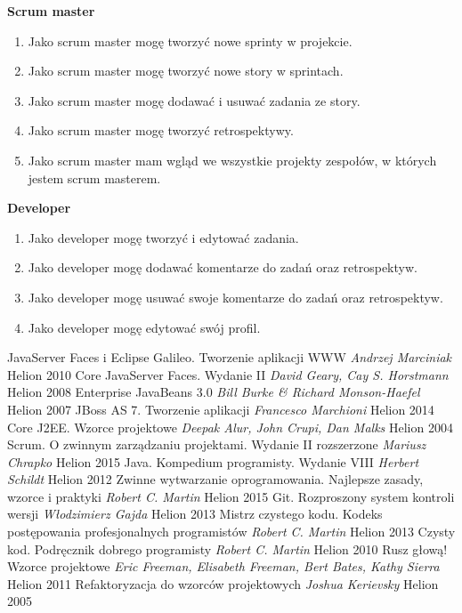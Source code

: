 	\textbf{Scrum master}
	\begin{enumerate}		
		\item Jako scrum master mogę tworzyć nowe sprinty w projekcie.
		\item Jako scrum master mogę tworzyć nowe story w sprintach.
		\item Jako scrum master mogę dodawać i usuwać zadania ze story.
		\item Jako scrum master mogę tworzyć retrospektywy.
		\item Jako scrum master mam wgląd we wszystkie projekty zespołów, w których jestem scrum masterem.
	\end{enumerate}
	\textbf{Developer}
	\begin{enumerate}		
		\item Jako developer mogę tworzyć i edytować zadania.
		\item Jako developer mogę dodawać komentarze do zadań oraz retrospektyw.
		\item Jako developer mogę usuwać swoje komentarze do zadań oraz retrospektyw.
		\item Jako developer mogę edytować swój profil.
	\end{enumerate}
	

\newpage
\begin{thebibliography}{99}
	 JavaServer Faces i Eclipse Galileo. Tworzenie aplikacji WWW \emph{Andrzej Marciniak} Helion 2010
	 Core JavaServer Faces. Wydanie II \emph{David Geary, Cay S. Horstmann} Helion 2008
	 Enterprise JavaBeans 3.0 \emph{Bill Burke \& Richard Monson-Haefel} Helion 2007
	 JBoss AS 7. Tworzenie aplikacji \emph{Francesco Marchioni} Helion 2014
	 Core J2EE. Wzorce projektowe \emph{Deepak Alur, John Crupi, Dan Malks} Helion 2004
	 Scrum. O zwinnym zarządzaniu projektami. Wydanie II rozszerzone \emph{Mariusz Chrapko} Helion 2015
	 Java. Kompedium programisty. Wydanie VIII \emph{Herbert Schildt} Helion 2012
	 Zwinne wytwarzanie oprogramowania. Najlepsze zasady, wzorce i praktyki \emph{Robert C. Martin} Helion 2015
	 Git. Rozproszony system kontroli wersji \emph{Włodzimierz Gajda} Helion 2013
	 Mistrz czystego kodu. Kodeks postępowania profesjonalnych programistów \emph{Robert C. Martin} Helion 2013
	 Czysty kod. Podręcznik dobrego programisty \emph{Robert C. Martin} Helion 2010
	 Rusz głową! Wzorce projektowe \emph{Eric Freeman, Elisabeth Freeman, Bert Bates, Kathy Sierra} Helion 2011
	 Refaktoryzacja do wzorców projektowych \emph{Joshua Kerievsky} Helion 2005	
\end{thebibliography}

